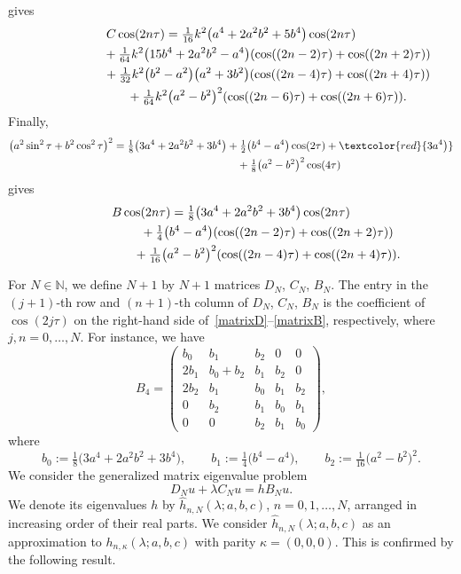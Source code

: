 \documentclass[10pt,a4paper]{amsart}
\newcommand{\RS}[1]{\textcolor{red}{#1}}
\newcommand{\N}{\mathbb{N}}
\numberwithin{equation}{section}
\begin{document}
gives
\begin{gather}
 C\cos(2n\tau)=
 \tfrac1{16} k^2\bigl(a^4+2a^2b^2+5b^4\bigr)\cos(2n\tau)\nonumber\\ \hphantom{ C\cos(2n\tau)=}{}
 +\tfrac1{64} k^2\bigl(15b^4+2a^2b^2-a^4\bigr)(\cos((2n-2)\tau)+\cos((2n+2)\tau))\nonumber\\ \hphantom{ C\cos(2n\tau)=}{}
 +\tfrac1{32} k^2 \bigl(b^2-a^2\bigr)\bigl(a^2+3b^2\bigr)(\cos((2n-4)\tau)+\cos((2n+4)\tau))\nonumber\\ \hphantom{ C\cos(2n\tau)=}{}
 +\tfrac1{64} k^2 \bigl(a^2-b^2\bigr)^2 (\cos((2n-6)\tau)+\cos((2n+6)\tau)).\label{matrixC}
\end{gather}
Finally,
\begin{gather*}
\bigl(a^2\sin^2\tau+b^2\cos^2\tau\bigr)^2 =\tfrac18\bigl(3a^4+2a^2b^2+3b^4\bigr)+\tfrac12\bigl(b^4-a^4\bigr)\cos(2\tau)+ \RS{3a^4\bigr)}\\
\hphantom{\bigl(a^2\sin^2\tau+b^2\cos^2\tau\bigr)^2 =}{}
+\tfrac18\bigl(a^2-b^2\bigr)^2\cos(4\tau)
\end{gather*}
gives
\begin{gather}
B\cos(2n\tau)=
 \tfrac18\bigl(3a^4+2a^2b^2+3b^4\bigr)\cos(2n\tau)\nonumber\\ \hphantom{B\cos(2n\tau)=}{}
 +\tfrac14\bigl(b^4-a^4\bigr) (\cos((2n-2)\tau)+\cos((2n+2)\tau))\nonumber\\ \hphantom{B\cos(2n\tau)=}{}
 +\tfrac1{16}\bigl(a^2-b^2\bigr)^2 (\cos((2n-4)\tau)+\cos((2n+4)\tau)).\label{matrixB}
\end{gather}

For $N\in\N$, we define $N+1$ by $N+1$ matrices $D_N$, $C_N$, $B_N$.
The entry in the $(j+1)$-th row and $(n+1)$-th column of $D_N$, $C_N$, $B_N$ is the coefficient of $\cos(2j\tau)$ on the right-hand side of~\eqref{matrixD}--\eqref{matrixB}, respectively, where $j,n=0,\dots,N$.
For instance, we have
\[ B_4=\begin{pmatrix} b_0 & b_1 & b_2 & 0 &0\\ 2b_1 & b_0+b_2 & b_1 & b_2 &0 \\
2b_2 & b_1 & b_0 & b_1&b_2 \\
0 & b_2 & b_1 & b_0 &b_1\\
0 & 0 & b_2 & b_1 & b_0
\end{pmatrix},\]
where
\[ b_0:=\tfrac18\bigl(3a^4+2a^2b^2+3b^4\bigr),\qquad b_1:=\tfrac14\bigl(b^4-a^4\bigr),\qquad b_2:=\tfrac1{16}\bigl(a^2-b^2\bigr)^2 .\]
We consider the generalized matrix eigenvalue problem
\begin{equation*}%
 D_N u+\lambda C_Nu= h B_N u.
 \end{equation*}
We denote its eigenvalues $h$ by $\hat h_{n,N}(\lambda;a,b,c)$, $n=0,1,\dots,N$, arranged in increasing order of their
real parts. We consider $\hat h_{n,N}(\lambda;a,b,c)$ as an approximation to $h_{n,\kappa}(\lambda;a,b,c)$
with parity $\kappa=(0,0,0)$. This is confirmed by the following result.
\end{document}
